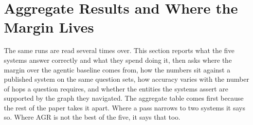%
%
%
%
%
%

\section{Aggregate Results and Where the Margin Lives}\label{sec:results}

The same runs are read several times over. This section reports what the
five systems answer correctly and what they spend doing it, then asks
where the margin over the agentic baseline comes from, how the numbers
sit against a published system on the same question sets, how accuracy
varies with the number of hops a question requires, and whether the
entities the systems assert are supported by the graph they navigated.
The aggregate table comes first because the rest of the paper takes it
apart. Where a pass narrows to two systems it says so. Where AGR is not
the best of the five, it says that too.

